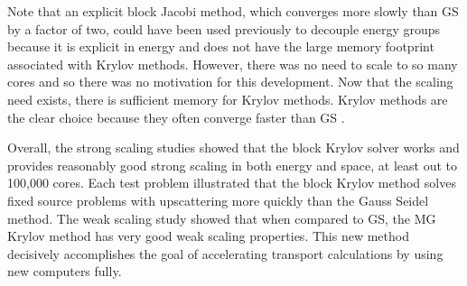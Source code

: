 Note that an explicit block Jacobi method, which converges more slowly than GS by a factor of two, could have been used previously to decouple energy groups because it is explicit in energy and does not have the large memory footprint associated with Krylov methods. However, there was no need to scale to so many cores and so there was no motivation for this development. Now that the scaling need exists, there is sufficient memory for Krylov methods. Krylov methods are the clear choice because they often converge faster than GS \cite{LeVeque2007}. 

Overall, the strong scaling studies showed that the block Krylov solver works and provides reasonably good strong scaling in both energy and space, at least out to 100,000 cores. Each test problem illustrated that the block Krylov method solves fixed source problems with upscattering more quickly than the Gauss Seidel method. The weak scaling study showed that when compared to GS, the MG Krylov method has very good weak scaling properties. This new method decisively accomplishes the goal of accelerating transport calculations by using new computers fully.

